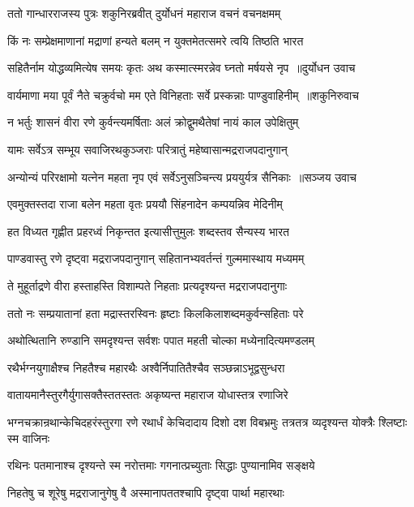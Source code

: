 \twolineshloka
{ततो गान्धारराजस्य पुत्रः शकुनिरब्रवीत्}
{दुर्योधनं महाराज वचनं वचनक्षमम्}


\twolineshloka
{किं नः सम्प्रेक्षमाणानां मद्राणां हन्यते बलम्}
{न युक्तमेतत्समरे त्वयि तिष्ठति भारत}


\threelineshloka
{सहितैर्नाम योद्धव्यमित्येष समयः कृतः}
{अथ कस्मात्स्मरन्नेव घ्नतो मर्षयसे नृप ॥दुर्योधन उवाच}
{}


\threelineshloka
{वार्यमाणा मया पूर्वं नैते चक्रुर्वचो मम}
{एते विनिहताः सर्वे प्रस्कन्नाः पाण्डुवाहिनीम् ॥शकुनिरुवाच}
{}


\twolineshloka
{न भर्तुः शासनं वीरा रणे कुर्वन्त्यमर्षिताः}
{अलं क्रोद्वुमथैतेषां नायं काल उपेक्षितुम्}


\twolineshloka
{यामः सर्वेऽत्र सम्भूय सवाजिरथकुञ्जराः}
{परित्रातुं महेष्वासान्मद्रराजपदानुगान्}


\threelineshloka
{अन्योन्यं परिरक्षामो यत्नेन महता नृप}
{एवं सर्वेऽनुसञ्चिन्त्य प्रययुर्यत्र सैनिकाः ॥सञ्जय उवाच}
{}


\twolineshloka
{एवमुक्तस्तदा राजा बलेन महता वृतः}
{प्रययौ सिंहनादेन कम्पयन्निव मेदिनीम्}


\twolineshloka
{हत विध्यत गृह्णीत प्रहरध्वं निकृन्तत}
{इत्यासीत्तुमुलः शब्दस्तव सैन्यस्य भारत}


\twolineshloka
{पाण्डवास्तु रणे दृष्ट्वा मद्रराजपदानुगान्}
{सहितानभ्यवर्तन्तं गुल्ममास्थाय मध्यमम्}


\twolineshloka
{ते मुहूर्ताद्रणे वीरा हस्ताहस्ति विशाम्पते}
{निहताः प्रत्यदृश्यन्त मद्रराजपदानुगाः}


\twolineshloka
{ततो नः सम्प्रयातानां हता मद्रास्तरस्विनः}
{हृष्टाः किलकिलाशब्दमकुर्वन्सहिताः परे}


\twolineshloka
{अथोत्थितानि रुण्डानि समदृश्यन्त सर्वशः}
{पपात महती चोल्का मध्येनादित्यमण्डलम्}


\twolineshloka
{रथैर्भग्नयुगाक्षैश्च निहतैश्च महारथैः}
{अश्वैर्निपातितैश्चैव सञ्छन्नाऽभूद्वसुन्धरा}


\twolineshloka
{वातायमानैस्तुरगैर्युगासक्तैस्ततस्ततः}
{अकृष्यन्त महाराज योधास्तत्र रणाजिरे}


\threelineshloka
{भग्नचक्रान्रथान्केचिदहरंस्तुरगा रणे}
{रथार्धं केचिदादाय दिशो दश विबभ्रमुः}
{तत्रतत्र व्यदृश्यन्त योक्त्रैः श्लिष्टाः स्म वाजिनः}


\twolineshloka
{रथिनः पतमानाश्च दृश्यन्ते स्म नरोत्तमाः}
{गगनात्प्रच्युताः सिद्धाः पुण्यानामिव सङ्क्षये}


\twolineshloka
{निहतेषु च शूरेषु मद्रराजानुगेषु वै}
{अस्मानापततश्चापि दृष्ट्वा पार्था महारथाः}


